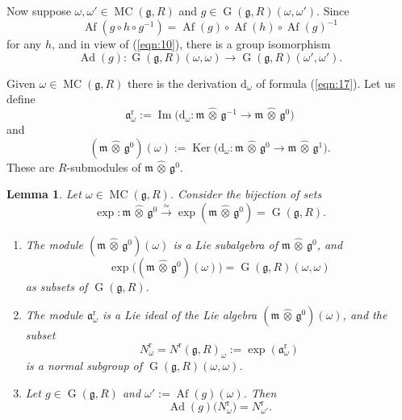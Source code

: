 \documentclass[a4paper,10pt]{amsart}
\newtheorem{lem}[equation]{Lemma}
\theoremstyle{definition}
\numberwithin{equation}{section}
\newcommand{\iso}{\xrightarrow{\simeq}}
\newcommand{\opn}{\operatorname}
\newcommand{\mfrak}[1]{\mathfrak{#1}}
\newcommand{\mrm}[1]{\mathrm{#1}}
\newcommand{\what}[1]{\widehat{#1}}
\newcommand{\hatotimes}{\, \what{\otimes} \,}
\newcommand{\g}{\mfrak{g}}
\newcommand{\m}{\mfrak{m}}
\renewcommand{\a}{\mfrak{a}}
\renewcommand{\d}{\mrm{d}}
\newcommand{\om}{\omega}
\begin{document}
Now suppose $\om, \om' \in \opn{MC}(\g, R)$ and 
$g \in \opn{G}(\g, R)(\om, \om')$. 
Since  
\[ \opn{Af}(g \circ h \circ g^{-1}) = 
\opn{Af}(g) \circ \opn{Af}(h) \circ \opn{Af}(g)^{-1}  \]
for any $h$, and in view of (\ref{eqn:10}), there is a group isomorphism
\begin{equation}
\opn{Ad}(g) : \opn{G}(\g, R)(\om, \om) \to \opn{G}(\g, R)(\om', \om') .
\end{equation}

Given $\om \in \opn{MC}(\g, R)$ there is the derivation 
$\d_{\om}$ of formula (\ref{eqn:17}). Let us define
\begin{equation} \label{eqn:14}
\a^{\mrm{r}}_{\om} := \opn{Im} \bigl( \d_{\om} : 
\m \hatotimes \g^{-1} \to  \m \hatotimes \g^0 \bigr)
\end{equation}
and 
\begin{equation} \label{eqn:15}
(\m \hatotimes \g^0)(\om) := \opn{Ker} \bigl( \d_{\om} : 
\m \hatotimes \g^{0} \to  \m \hatotimes \g^1 \bigr) . 
\end{equation}
These are $R$-submodules of $\m \hatotimes \g^0$.

\begin{lem} \label{lem:4}
Let $\om \in \opn{MC}(\g, R)$.
Consider the bijection of sets
\[ \exp : \m \hatotimes \g^0 \iso \exp(\m \hatotimes \g^0) = 
\opn{G}(\g, R) . \]
\begin{enumerate}
\item The module 
$(\m \hatotimes \g^0)(\om)$ is a Lie subalgebra of 
$\m \hatotimes \g^0$, and 
\[ \exp \bigl( (\m \hatotimes \g^0)(\om) \bigr) = 
\opn{G}(\g, R)(\om, \om)  \]
as subsets of $\opn{G}(\g, R)$.

\item The module $\a^{\mrm{r}}_{\om}$ is a Lie ideal of the Lie algebra 
$(\m \hatotimes \g^0)(\om)$, and the subset
\[ N^{\mrm{r}}_{\om} = N^{\mrm{r}}(\g, R)_{\om} :=
\exp(\a^{\mrm{r}}_{\om}) \]
is a normal subgroup of $\opn{G}(\g, R)(\om, \om)$.

\item Let $g \in \opn{G}(\g, R)$ and
$\om' := \opn{Af}(g)(\om)$. Then 
\[ \opn{Ad}(g) \bigl( N^{\mrm{r}}_{\om} \bigr) = N^{\mrm{r}}_{\om'} . \]
\end{enumerate}
\end{lem}
\end{document}
